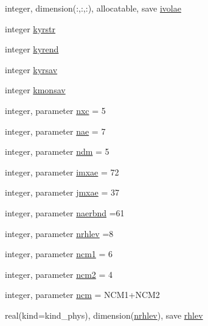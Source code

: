 \begin{DoxyCompactItemize}
\item 
integer, dimension(\+:,\+:,\+:), allocatable, save \hyperlink{namespacemodule__radiation__aerosols_ab016f51c81a1157ee234dc82f8f114ee}{ivolae}
\item 
integer \hyperlink{namespacemodule__radiation__aerosols_af224f7d7991e3d48aeaa4d221da50f41}{kyrstr}
\item 
integer \hyperlink{namespacemodule__radiation__aerosols_a79127786cce93bccf8749ef8c85f6467}{kyrend}
\item 
integer \hyperlink{namespacemodule__radiation__aerosols_a928c08857f866e4b848873a23a1d49e7}{kyrsav}
\item 
integer \hyperlink{namespacemodule__radiation__aerosols_a302ae8a5aa2b8fb08ad366ef124cee45}{kmonsav}
\item 
integer, parameter \hyperlink{namespacemodule__radiation__aerosols_a1fffbb55ad2986a216b721a6c103c4cf}{nxc} = 5
\item 
integer, parameter \hyperlink{namespacemodule__radiation__aerosols_a45121ca4dcb3194e8afb4090fa810657}{nae} = 7
\item 
integer, parameter \hyperlink{namespacemodule__radiation__aerosols_ae77b22f76f193cef19b6e6c3ee8e0773}{ndm} = 5
\item 
integer, parameter \hyperlink{namespacemodule__radiation__aerosols_a52cda855a397136f75768d205292ddbb}{imxae} = 72
\item 
integer, parameter \hyperlink{namespacemodule__radiation__aerosols_afdfdd058364062349b02cec9c712ea80}{jmxae} = 37
\item 
integer, parameter \hyperlink{namespacemodule__radiation__aerosols_ae8ffb66e7e617f045663ce2732743b4a}{naerbnd} =61
\item 
integer, parameter \hyperlink{namespacemodule__radiation__aerosols_aa6d18b0588e80cb40871cc75870d09ba}{nrhlev} =8
\item 
integer, parameter \hyperlink{namespacemodule__radiation__aerosols_ac6bc533a79d4b19129834cbc9a9fbc18}{ncm1} = 6
\item 
integer, parameter \hyperlink{namespacemodule__radiation__aerosols_a61dbcce5b0bb02dd31d4a37983887a7b}{ncm2} = 4
\item 
integer, parameter \hyperlink{namespacemodule__radiation__aerosols_ab46e61a4a386794a5e9e97d8ef7d98a5}{ncm} = N\+C\+M1+N\+C\+M2
\item 
real(kind=kind\+\_\+phys), dimension(\hyperlink{namespacemodule__radiation__aerosols_aa6d18b0588e80cb40871cc75870d09ba}{nrhlev}), save \hyperlink{namespacemodule__radiation__aerosols_a6aa3218393ea05cab77ab7867cfeab90}{rhlev}

\end{DoxyCompactItemize}
